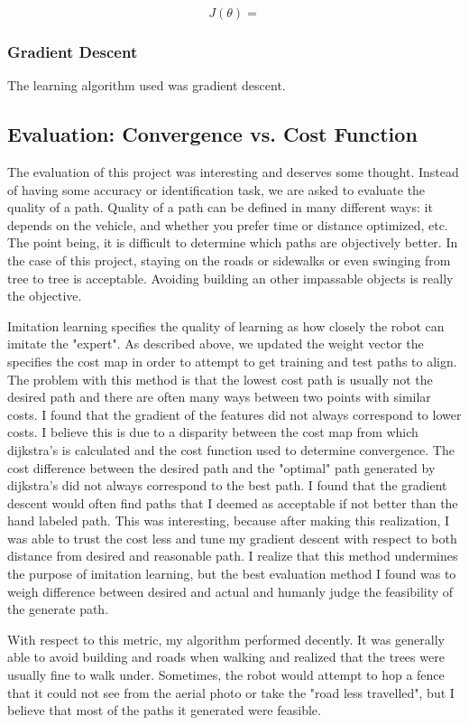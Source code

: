 \documentclass{article}
\begin{document}
$$J(\theta) = $$

\subsubsection{Gradient Descent}
The learning algorithm used was gradient descent. 



\subsection{Evaluation: Convergence vs. Cost Function}
\par
The evaluation of this project was interesting and deserves some thought. Instead of having some accuracy or identification task, we are asked to evaluate the quality of a path. Quality of a path can be defined in many different ways: it depends on the vehicle, and whether you prefer time or distance optimized, etc. The point being, it is difficult to determine which paths are objectively better. In the case of this project, staying on the roads or sidewalks or even swinging from tree to tree is acceptable. Avoiding building an other impassable objects is really the objective. 
\par
Imitation learning specifies the quality of learning as how closely the robot can imitate the "expert". As described above, we updated the weight vector the specifies the cost map in order to attempt to get training and test paths to align. The problem with this method is that the lowest cost path is usually not the desired path and there are often many ways between two points with similar costs. I found that the gradient of the features did not always correspond to lower costs. I believe this is due to a disparity between the cost map from which dijkstra's is calculated and the cost function used to determine convergence. The cost difference between the desired path and the "optimal" path generated by dijkstra's  did not always correspond to the best path. I found that the gradient descent would often find paths that I deemed as acceptable if not better than the hand labeled path. This was interesting, because after making this realization, I was able to trust the cost less and tune my gradient descent with respect to both distance from desired and reasonable path. I realize that this method undermines the purpose of imitation learning, but the best evaluation method I found was to weigh difference between desired and actual and humanly judge the feasibility of the generate path.
\par
With respect to this metric, my algorithm performed decently. It was generally able to avoid building and roads when walking and realized that the trees were usually fine to walk under. Sometimes, the robot would attempt to hop a fence that it could not see from the aerial photo or take the "road less travelled", but I believe that most of the paths it generated were feasible.
\end{document}
